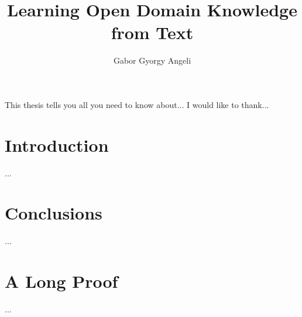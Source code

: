 
\title{Learning Open Domain Knowledge from Text}
\author{Gabor Gyorgy Angeli}

\beforepreface
{}
    This thesis tells you all you need to know about...
    I would like to thank...
\afterpreface

\chapter{Introduction}
\cite{key:2010angeli-generation}
     ...
\chapter{Conclusions}
     ...
\appendix
\chapter{A Long Proof}
     ...



